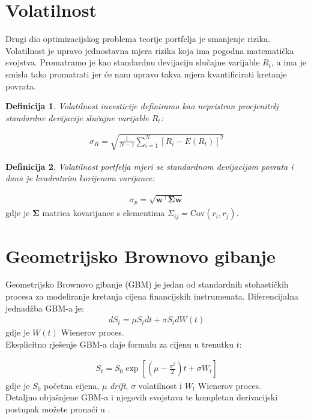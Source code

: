 \documentclass[zavrsnirad, upload]{fer}
\newtheorem{definition}{Definicija}
\begin{document}
\section{Volatilnost}
Drugi dio optimizacijskog problema teorije portfelja je smanjenje rizika.
Volatilnost je upravo jednostavna mjera rizika koja ima pogodna matematička svojstva.
Promatramo je kao standardnu devijaciju slučajne varijable $R_t$, a ima je smisla tako promatrati
jer će nam upravo takva mjera kvantificirati kretanje povrata.
\begin{definition}
	Volatilnost investicije definiramo kao nepristran procjenitelj
	standardne devijacije slučajne varijable $R_t$:
\end{definition}
\begin{align}
	\sigma_R = \sqrt{\frac{1}{N - 1} \sum_{i = 1}^{N} \left[R_i - E(R_t)\right]^2}
\end{align}
\begin{definition}
Volatilnost portfelja mjeri se standardnom devijacijom povrata i dana je kvadratnim korijenom varijance:
\end{definition}
\begin{align}
\sigma_p = \sqrt{\mathbf{w}^\intercal \boldsymbol{\Sigma} \mathbf{w}}
\end{align}
\indent gdje je $\boldsymbol{\Sigma}$ matrica kovarijance s elementima $\Sigma_{ij} = \text{Cov}(r_i, r_j)$.

\section{Geometrijsko Brownovo gibanje}
\label{sek:gbm}
Geometrijsko Brownovo gibanje (GBM) je jedan od standardnih
stohastičkih procesa za modeliranje kretanja cijena financijskih instrumenata.
Diferencijalna jednadžba GBM-a je:
\begin{align}
    dS_t = \mu S_t dt + \sigma S_t dW\left(t\right)
\end{align}
\indent gdje je $W\left(t\right)$ Wienerov proces.\\
Eksplicitno rješenje GBM-a daje formulu za cijenu u trenutku $t$:

\begin{align}
S_t = S_0 \exp\left[\left(\mu - \frac{\sigma^2}{2}\right)t +
    \sigma W_t\right] \label{eq:gbm}
\end{align}
\indent gdje je $S_0$ početna cijena, $\mu$ \textit{drift}, $\sigma$ volatilnost i $W_t$
Wienerov proces.\\
Detaljno objašnjene GBM-a i njegovih svojstava te kompletan derivacijski
postupak možete pronaći u \cite{GMBIzvod}.
\end{document}
